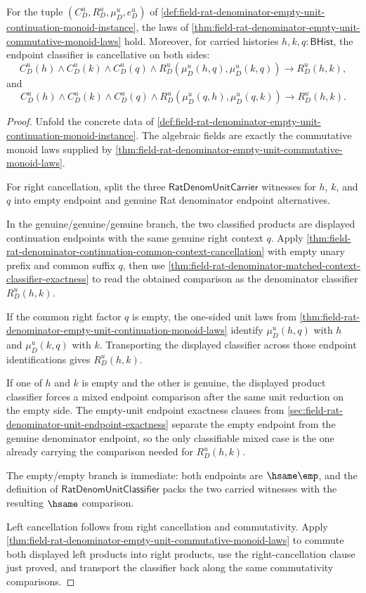 \begin{theorem}
\label{thm:field-rat-denominator-empty-unit-cancellative-commutative-monoid-package}
For the tuple $(C_D^u,R_D^u,\mu_D^u,e_D^u)$ of
\autoref{def:field-rat-denominator-empty-unit-continuation-monoid-instance},
the laws of
\autoref{thm:field-rat-denominator-empty-unit-commutative-monoid-laws} hold.
Moreover, for carried histories $h,k,q:\mathsf{BHist}$, the endpoint classifier
is cancellative on both sides:
$$
C_D^u(h)\land C_D^u(k)\land C_D^u(q)\land
R_D^u(\mu_D^u(h,q),\mu_D^u(k,q))
\to R_D^u(h,k),
$$
and
$$
C_D^u(h)\land C_D^u(k)\land C_D^u(q)\land
R_D^u(\mu_D^u(q,h),\mu_D^u(q,k))
\to R_D^u(h,k).
$$
\end{theorem}
\begin{proof}
Unfold the concrete data of
\autoref{def:field-rat-denominator-empty-unit-continuation-monoid-instance}.
The algebraic fields are exactly the commutative monoid laws supplied by
\autoref{thm:field-rat-denominator-empty-unit-commutative-monoid-laws}.

For right cancellation, split the three
$\mathsf{RatDenomUnitCarrier}$ witnesses for $h$, $k$, and $q$ into empty
endpoint and genuine Rat denominator endpoint alternatives.

In the genuine/genuine/genuine branch, the two classified products are displayed
continuation endpoints with the same genuine right context $q$. Apply
\autoref{thm:field-rat-denominator-continuation-common-context-cancellation}
with empty unary prefix and common suffix $q$, then use
\autoref{thm:field-rat-denominator-matched-context-classifier-exactness} to read
the obtained comparison as the denominator classifier $R_D^u(h,k)$.

If the common right factor $q$ is empty, the one-sided unit laws from
\autoref{thm:field-rat-denominator-empty-unit-continuation-monoid-laws} identify
$\mu_D^u(h,q)$ with $h$ and $\mu_D^u(k,q)$ with $k$. Transporting the displayed
classifier across those endpoint identifications gives $R_D^u(h,k)$.

If one of $h$ and $k$ is empty and the other is genuine, the displayed product
classifier forces a mixed endpoint comparison after the same unit reduction on
the empty side. The empty-unit endpoint exactness clauses from
\autoref{sec:field-rat-denominator-unit-endpoint-exactness} separate the empty
endpoint from the genuine denominator endpoint, so the only classifiable mixed
case is the one already carrying the comparison needed for $R_D^u(h,k)$.

The empty/empty branch is immediate: both endpoints are $\hsame\emp$, and the
definition of $\mathsf{RatDenomUnitClassifier}$ packs the two carried witnesses
with the resulting $\hsame$ comparison.

Left cancellation follows from right cancellation and commutativity. Apply
\autoref{thm:field-rat-denominator-empty-unit-commutative-monoid-laws} to commute
both displayed left products into right products, use the right-cancellation
clause just proved, and transport the classifier back along the same
commutativity comparisons.
\end{proof}

